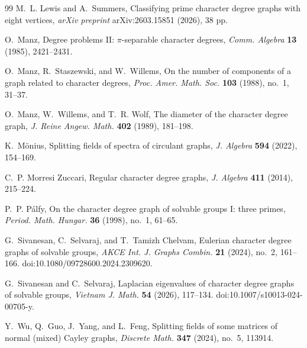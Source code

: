 \documentclass[11pt]{amsart}
\begin{document}
\begin{thebibliography}{99}
M.~L. Lewis and A.~Summers,
Classifying prime character degree graphs with eight vertices,
\textit{arXiv preprint} arXiv:2603.15851 (2026), 38 pp.

O.~Manz, 
Degree problems II: $\pi$-separable character degrees, 
\textit{Comm. Algebra} \textbf{13} (1985), 2421--2431.

O.~Manz, R.~Staszewski, and W.~Willems, 
On the number of components of a graph related to character degrees, 
\textit{Proc. Amer. Math. Soc.} \textbf{103} (1988), no.~1, 31--37.

O.~Manz, W.~Willems, and T.~R. Wolf, 
The diameter of the character degree graph, 
\textit{J. Reine Angew. Math.} \textbf{402} (1989), 181--198.

K.~M\"onius, 
Splitting fields of spectra of circulant graphs, 
\textit{J. Algebra} \textbf{594} (2022), 154--169.

C.~P. Morresi Zuccari, 
Regular character degree graphs, 
\textit{J. Algebra} \textbf{411} (2014), 215--224.

P.~P. Pálfy, 
On the character degree graph of solvable groups I: three primes, 
\textit{Period. Math. Hungar.} \textbf{36} (1998), no.~1, 61--65.

G.~Sivanesan, C.~Selvaraj, and T.~Tamizh Chelvam, 
Eulerian character degree graphs of solvable groups, 
\textit{AKCE Int. J. Graphs Combin.} \textbf{21} (2024), no.~2, 161--166. 
doi:10.1080/09728600.2024.2309620.

G.~Sivanesan and C.~Selvaraj,
Laplacian eigenvalues of character degree graphs of solvable groups,
\textit{Vietnam J. Math.} \textbf{54} (2026), 117--134.
doi:10.1007/s10013-024-00705-y.

Y.~Wu, Q.~Guo, J.~Yang, and L.~Feng, 
Splitting fields of some matrices of normal (mixed) Cayley graphs, 
\textit{Discrete Math.} \textbf{347} (2024), no.~5, 113914.


\end{thebibliography}
\end{document}
